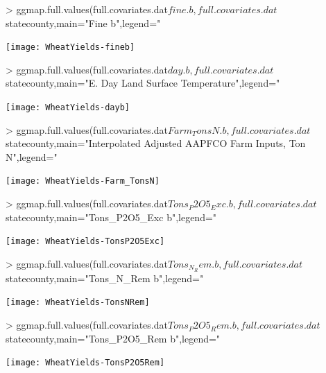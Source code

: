 \documentclass{report}
\begin{document}
\begin{Schunk}
\begin{Sinput}
> ggmap.full.values(full.covariates.dat$fine.b,full.covariates.dat$statecounty,main="Fine b",legend="%
\end{Sinput}
\end{Schunk}
\texttt{[image: WheatYields-fineb]}


\begin{Schunk}
\begin{Sinput}
> ggmap.full.values(full.covariates.dat$day.b,full.covariates.dat$statecounty,main="E. Day Land Surface Temperature",legend="%
\end{Sinput}
\end{Schunk}
\texttt{[image: WheatYields-dayb]}

\begin{Schunk}
\begin{Sinput}
> ggmap.full.values(full.covariates.dat$Farm_TonsN.b,full.covariates.dat$statecounty,main="Interpolated Adjusted AAPFCO Farm Inputs, Ton N",legend="%
\end{Sinput}
\end{Schunk}
\texttt{[image: WheatYields-Farm\_TonsN]}

\begin{Schunk}
\begin{Sinput}
> ggmap.full.values(full.covariates.dat$Tons_P2O5_Exc.b,full.covariates.dat$statecounty,main="Tons_P2O5_Exc b",legend="%
\end{Sinput}
\end{Schunk}
\texttt{[image: WheatYields-TonsP2O5Exc]}

\begin{Schunk}
\begin{Sinput}
> ggmap.full.values(full.covariates.dat$Tons_N_Rem.b,full.covariates.dat$statecounty,main="Tons_N_Rem b",legend="%
\end{Sinput}
\end{Schunk}
\texttt{[image: WheatYields-TonsNRem]}

\begin{Schunk}
\begin{Sinput}
> ggmap.full.values(full.covariates.dat$Tons_P2O5_Rem.b,full.covariates.dat$statecounty,main="Tons_P2O5_Rem b",legend="%
\end{Sinput}
\end{Schunk}
\texttt{[image: WheatYields-TonsP2O5Rem]}
\end{document}
